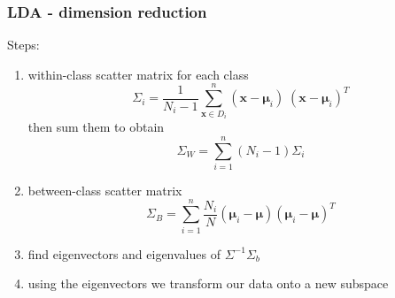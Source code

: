 \begin{frame}
	\frametitle{LDA - dimension reduction}
Steps:
\begin{enumerate}
	\item within-class scatter matrix for each class
	\begin{equation}
	\Sigma_i = \frac{1}{N_{i}-1} \sum\limits_{\pmb x \in D_i}^n (\pmb x - \pmb \mu_i)\;(\pmb x - \pmb \mu_i)^T
	\end{equation} 
	then sum them to obtain
	\begin{equation}
	\Sigma_W = \sum\limits_{i =1}^{n} (N_i - 1) \Sigma_i 
	\end{equation}
	
	\item between-class scatter matrix
	 \begin{equation}
	\Sigma_B = \sum\limits_{i =1}^n \dfrac{N_i}{N} (\pmb \mu_i - \pmb \mu) (\pmb \mu_i - \pmb \mu)^T
	\end{equation}
	
	\item find eigenvectors and eigenvalues of $\Sigma^{-1} \Sigma_b$
	\item using the eigenvectors we transform our data onto a new subspace
\end{enumerate}
\end{frame}

